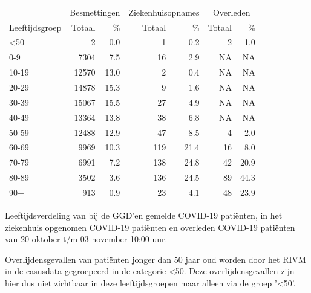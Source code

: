 \documentclass[
  english,
  man,floatsintext]{apa6}
\begin{document}
\begin{table}
\centering\begingroup\fontsize{11}{13}\selectfont

\begin{threeparttable}
\begin{tabular}{lrrrrrr}
\toprule
\multicolumn{1}{c}{ } & \multicolumn{2}{c}{Besmettingen} & \multicolumn{2}{c}{Ziekenhuisopnames} & \multicolumn{2}{c}{Overleden} \\
\cmidrule(l{3pt}r{3pt}){2-3} \cmidrule(l{3pt}r{3pt}){4-5} \cmidrule(l{3pt}r{3pt}){6-7}
Leeftijdsgroep & Totaal & \% & Totaal & \% & Totaal & \%\\
\midrule
<50 & 2 & 0.0 & 1 & 0.2 & 2 & 1.0\\
0-9 & 7304 & 7.5 & 16 & 2.9 & NA & NA\\
10-19 & 12570 & 13.0 & 2 & 0.4 & NA & NA\\
20-29 & 14878 & 15.3 & 9 & 1.6 & NA & NA\\
30-39 & 15067 & 15.5 & 27 & 4.9 & NA & NA\\
40-49 & 13364 & 13.8 & 38 & 6.8 & NA & NA\\
50-59 & 12488 & 12.9 & 47 & 8.5 & 4 & 2.0\\
60-69 & 9969 & 10.3 & 119 & 21.4 & 16 & 8.0\\
70-79 & 6991 & 7.2 & 138 & 24.8 & 42 & 20.9\\
80-89 & 3502 & 3.6 & 136 & 24.5 & 89 & 44.3\\
90+ & 913 & 0.9 & 23 & 4.1 & 48 & 23.9\\
\bottomrule
\end{tabular}
\begin{tablenotes}
\item[1] Leeftijdsverdeling van bij de GGD’en gemelde COVID-19 patiënten, in het ziekenhuis opgenomen COVID-19 patiënten en overleden COVID-19 patiënten van 20 oktober t/m 03 november 10:00 uur.
\item[2] Overlijdensgevallen van patiënten jonger dan 50 jaar oud worden door het RIVM in de casusdata gegroepeerd in de categorie <50. Deze overlijdensgevallen zijn hier dus niet zichtbaar in deze leeftijdsgroepen maar alleen via de groep '<50'.
\end{tablenotes}
\end{threeparttable}
\endgroup{}
\end{table}

\newpage
\end{document}
